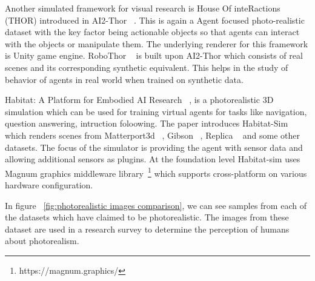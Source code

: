 Another simulated framework for visual research is House Of inteRactions (THOR) introduced in AI2-Thor ~\cite{kolve2019ai2thor}.
This is again a Agent focused photo-realistic dataset with the key factor being actionable objects so that agents can interact with the objects or manipulate them.
The underlying renderer for this framework is Unity game engine.
RoboThor ~\cite{Deitke2020RoboTHORAO} is built upon AI2-Thor which consists of real scenes and its corresponding synthetic equivalent.
This helps in the study of behavior of agents in real world when trained on synthetic data.

Habitat: A Platform for Embodied AI Research ~\cite{savva2019habitat}, is a photorealistic 3D simulation which can be used for training virtual agents for tasks like navigation, question answering, intruction foloowing.
The paper introduces Habitat-Sim which renders scenes from Matterport3d ~\cite{chang2017matterport3d}, Gibson ~\cite{xia2018gibson}, Replica ~\cite{Straub2019TheRD} and some other datasets.
The focus of the simulator is providing the agent with sensor data and allowing additional sensors as plugins.
At the foundation level Habitat-sim uses Magnum graphics
middleware library~\footnote{https://magnum.graphics/} which supports cross-platform on various hardware configuration.

In figure ~\ref{fig:photorealistic images comparison}, we can see samples from each of the datasets which have claimed to be photorealistic.
The images from these dataset are used in a research survey to determine the perception of humans about photorealism.



